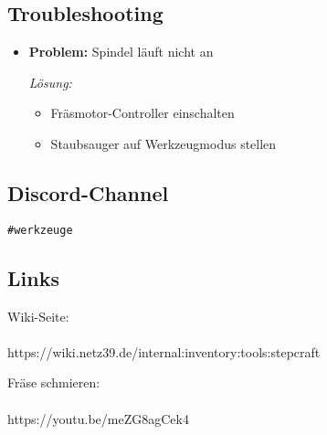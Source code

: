 \documentclass{article}
\begin{document}
	\noindent\dotfill
	\subsection*{Troubleshooting}
	\begin{itemize}
		\item \textbf{Problem:} Spindel läuft nicht an
		\begin{itemize}
			\textit{Lösung:}
			\begin{itemize}
				\item Fräsmotor-Controller einschalten
				\item Staubsauger auf Werkzeugmodus stellen
			\end{itemize}
		\end{itemize}
	\end{itemize}
	
	\noindent\dotfill
	\subsection*{Discord-Channel}
		\colorbox{gray!30}{\texttt{\#werkzeuge}}
	\vspace{1em}\\
	
	\noindent\dotfill
	\subsection*{Links}
	\begin{minipage}{0.45\textwidth}
		\centering
		Wiki-Seite:\\
		\\
		https://wiki.netz39.de/internal:inventory:tools:stepcraft
	\end{minipage}
	\hfill
	\begin{minipage}{0.45\textwidth}
		\centering
		Fräse schmieren:\\
		 \\
		https://youtu.be/meZG8agCek4 \\
	\end{minipage}
	\vspace{1em}
	
\end{document}

